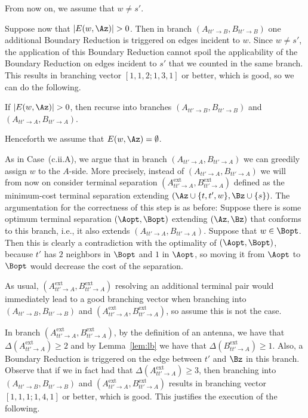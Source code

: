 From now on, we assume that $w\neq s'$.

Suppose now that $|E(w,\Az)|>0$. Then in branch $(A_{tt'\to B},B_{tt'\to B})$ one additional Boundary Reduction is triggered on edges incident to $w$. Since $w\neq s'$, the application of this Boundary Reduction cannot spoil the applicability of the Boundary Reduction on edges incident to $s'$ that we counted in the same branch. This results in branching vector $[1,1,2;1,3,1]$ or better, which is good, so we can do the following.

\begin{branching}
If $|E(w,\Az)|>0$, then recurse into branches $(A_{tt'\to B},B_{tt'\to B})$ and $(A_{tt'\to A},B_{tt'\to A})$.
\end{branching}

Henceforth we assume that $E(w,\Az)=\emptyset$.


\newcommand{\Aext}{A^{\textrm{ext}}_{tt'\to A}}
\newcommand{\Bext}{B^{\textrm{ext}}_{tt'\to A}}

As in Case~(c.ii.A), we argue that in branch $(A_{tt'\to A},B_{tt'\to A})$ we can greedily assign $w$ to the $A$-side. More precisely, instead of $(A_{tt'\to A},B_{tt'\to A})$ we will from now on consider terminal separation $(\Aext,\Bext)$ defined as the minimum-cost terminal separation extending $(\Az\cup \{t,t',w\},\Bz\cup \{s\})$. The argumentation for the correctness of this step is as before: Suppose there is some optimum terminal separation $(\Aopt,\Bopt)$ extending $(\Az,\Bz)$ that conforms to this branch, i.e., it also extends $(A_{tt'\to A},B_{tt'\to A})$. Suppose that $w\in \Bopt$. Then this is clearly a contradiction with the optimality of $(\Aopt,\Bopt)$, because $t'$ has $2$ neighbors in $\Bopt$ and $1$ in $\Aopt$, so moving it from $\Aopt$ to $\Bopt$ would decrease the cost of the separation. 

As usual, $(\Aext,\Bext)$ resolving an additional terminal pair would immediately lead to a good branching vector when branching into $(A_{tt'\to B},B_{tt'\to B})$ and $(\Aext,\Bext)$, so assume this is not the case.

In branch $(\Aext,\Bext)$, by the definition of an antenna, we have that $\Delta(\Aext)\geq 2$ and by Lemma~\ref{lem:lb} we have that $\Delta(\Bext)\geq 1$. Also, a Boundary Reduction is triggered on the edge between $t'$ and $\Bz$ in this branch. Observe that if we in fact had that $\Delta(\Aext)\geq 3$, then branching into $(A_{tt'\to B},B_{tt'\to B})$ and $(\Aext,\Bext)$ results in branching vector $[1,1,1;1,4,1]$ or better, which is good. This justifies the execution of the following.

